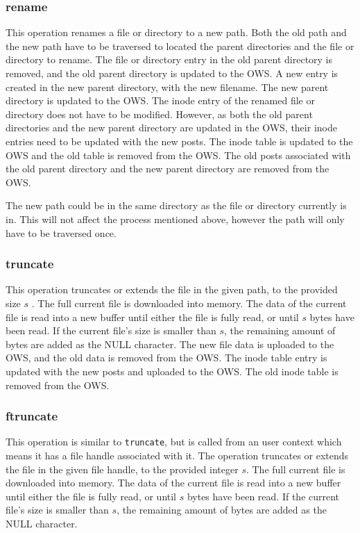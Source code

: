 \subsubsection{rename}
This operation renames a file or directory to a new path. Both the old path and the new path have to be traversed to located the parent directories and the file or directory to rename. The file or directory entry in the old parent directory is removed, and the old parent directory is updated to the OWS. A new entry is created in the new parent directory, with the new filename. The new parent directory is updated to the OWS. The inode entry of the renamed file or directory does not have to be modified. However, as both the old parent directories and the new parent directory are updated in the OWS, their inode entries need to be updated with the new posts. The inode table is updated to the OWS and the old table is removed from the OWS. The old posts associated with the old parent directory and the new parent directory are removed from the OWS.

The new path could be in the same directory as the file or directory currently is in. This will not affect the process mentioned above, however the path will only have to be traversed once.

\subsubsection{truncate}
This operation truncates or extends the file in the given path, to the provided size $s$ . The full current file is downloaded into memory. The data of the current file is read into a new buffer until either the file is fully read, or until $s$ bytes have been read. If the current file's size is smaller than $s$, the remaining amount of bytes are added as the NULL character. The new file data is uploaded to the OWS, and the old data is removed from the OWS. The inode table entry is updated with the new posts and uploaded to the OWS. The old inode table is removed from the OWS.

\subsubsection{ftruncate}
This operation is similar to \texttt{truncate}, but is called from an user context which means it has a file handle associated with it. The operation truncates or extends the file in the given file handle, to the provided integer $s$. The full current file is downloaded into memory. The data of the current file is read into a new buffer until either the file is fully read, or until $s$ bytes have been read. If the current file's size is smaller than $s$, the remaining amount of bytes are added as the NULL character.

